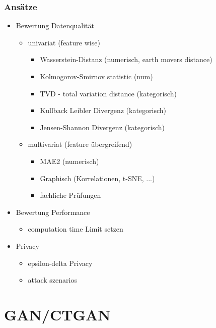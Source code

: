 \documentclass[
	11pt, %
]{beamer}
\begin{document}
\begin{frame}
    \frametitle{Ansätze}
    \begin{itemize}
        \item Bewertung Datenqualität
        \small{
        \begin{itemize}
            \item univariat (feature wise)
            \begin{itemize}
                \item Wasserstein-Distanz (numerisch, earth movers distance)
                \item Kolmogorov-Smirnov statistic (num)
                \item TVD - total variation distance (kategorisch)
                \item Kullback Leibler Divergenz (kategorisch)
            \item Jensen-Shannon Divergenz (kategorisch)
            \end{itemize}
            \item multivariat (feature übergreifend)
            \begin{itemize}
                \item MAE2 (numerisch) \parencite{escudie_evaluating_2026}
                \item Graphisch (Korrelationen, t-SNE, ...)
                \item fachliche Prüfungen
            \end{itemize}            
        \end{itemize}}
        \item Bewertung Performance  
        \begin{itemize}
            \item computation time Limit setzen
        \end{itemize}
        \item Privacy
        \begin{itemize}
            \item epsilon-delta Privacy
            \item attack szenarios
        \end{itemize}
    \end{itemize}
\end{frame}
\section{GAN/CTGAN}
\end{document}
